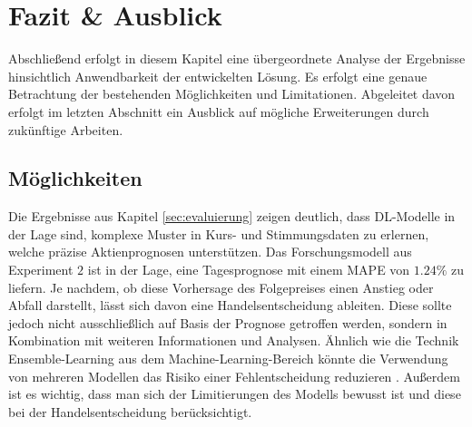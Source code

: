 \newpage
\section{Fazit \& Ausblick}
Abschließend erfolgt in diesem Kapitel eine übergeordnete Analyse der Ergebnisse hinsichtlich Anwendbarkeit der entwickelten Lösung. Es erfolgt eine genaue Betrachtung der bestehenden Möglichkeiten und Limitationen. Abgeleitet davon erfolgt im letzten Abschnitt ein Ausblick auf mögliche Erweiterungen durch zukünftige Arbeiten. 

\subsection{Möglichkeiten}\label{sec:evaluierung_chance}
Die Ergebnisse aus Kapitel \ref{sec:evaluierung} zeigen deutlich, dass \ac{DL}-Modelle in der Lage sind, komplexe Muster in Kurs- und Stimmungsdaten zu erlernen, welche präzise Aktienprognosen unterstützen. Das Forschungsmodell aus Experiment $2$ ist in der Lage, eine Tagesprognose mit einem \ac{MAPE} von $1.24\%$ zu liefern. Je nachdem, ob diese Vorhersage des Folgepreises einen Anstieg oder Abfall darstellt, lässt sich davon eine Handelsentscheidung ableiten. Diese sollte jedoch nicht ausschließlich auf Basis der Prognose getroffen werden, sondern in Kombination mit weiteren Informationen und Analysen. Ähnlich wie die Technik Ensemble-Learning aus dem Machine-Learning-Bereich könnte die Verwendung von mehreren Modellen das Risiko einer Fehlentscheidung reduzieren \autocite{wu2021ensemble}. Außerdem ist es wichtig, dass man sich der Limitierungen des Modells bewusst ist und diese bei der Handelsentscheidung berücksichtigt.


